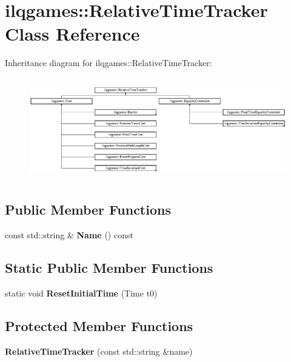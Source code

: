 \hypertarget{classilqgames_1_1_relative_time_tracker}{}\section{ilqgames\+:\+:Relative\+Time\+Tracker Class Reference}
\label{classilqgames_1_1_relative_time_tracker}
Inheritance diagram for ilqgames\+:\+:Relative\+Time\+Tracker\+:\begin{figure}[H]
\begin{center}
\leavevmode
\includegraphics[height=4.480000cm]{classilqgames_1_1_relative_time_tracker}
\end{center}
\end{figure}
\subsection*{Public Member Functions}
\begin{DoxyCompactItemize}
\item 
const std\+::string \& {\bfseries Name} () const \hypertarget{classilqgames_1_1_relative_time_tracker_a9d6d063f0a0940ee647965aaf8ade2b5}{}\label{classilqgames_1_1_relative_time_tracker_a9d6d063f0a0940ee647965aaf8ade2b5}

\end{DoxyCompactItemize}
\subsection*{Static Public Member Functions}
\begin{DoxyCompactItemize}
\item 
static void {\bfseries Reset\+Initial\+Time} (Time t0)\hypertarget{classilqgames_1_1_relative_time_tracker_abe976652bb51591cf72e027a7d1e9aee}{}\label{classilqgames_1_1_relative_time_tracker_abe976652bb51591cf72e027a7d1e9aee}

\end{DoxyCompactItemize}
\subsection*{Protected Member Functions}
\begin{DoxyCompactItemize}
\item 
{\bfseries Relative\+Time\+Tracker} (const std\+::string \&name)\hypertarget{classilqgames_1_1_relative_time_tracker_abb803cf6f36fc9b8e0c6178d3d4a7894}{}\label{classilqgames_1_1_relative_time_tracker_abb803cf6f36fc9b8e0c6178d3d4a7894}

\end{DoxyCompactItemize}
